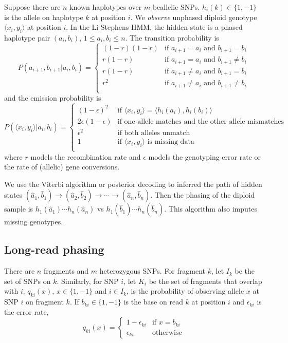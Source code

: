 \documentclass[10pt]{article}
\begin{document}
Suppose there are $n$ known haplotypes over $m$ beallelic SNPs.
$h_i(k)\in\{1,-1\}$ is the allele on haplotype $k$ at position $i$. We
\emph{observe} unphased diploid genotype $\langle x_i,y_i\rangle$ at position
$i$. In the Li-Stephens HMM, the hidden state is a phased haplotype pair
$(a_i,b_i)$, $1\le a_i,b_i\le n$. The transition probability is
$$
P(a_{i+1},b_{i+1}|a_i,b_i)=\left\{\begin{array}{ll}
(1-r)(1-r) & \mbox{if $a_{i+1}=a_i$ and $b_{i+1}=b_i$} \\
r(1-r) & \mbox{if $a_{i+1}=a_i$ and $b_{i+1}\not=b_i$} \\
r(1-r) & \mbox{if $a_{i+1}\not=a_i$ and $b_{i+1}=b_i$} \\
r^2 & \mbox{if $a_{i+1}\not=a_i$ and $b_{i+1}\not=b_i$} \\
\end{array}\right.
$$
and the emission probability is
$$
P(\langle x_i,y_i\rangle|a_i,b_i)=\left\{\begin{array}{ll}
(1-\epsilon)^2 & \mbox{if $\langle x_i,y_i\rangle=\langle h_i(a_i),h_i(b_i)\rangle$} \\
2\epsilon(1-\epsilon) & \mbox{if one allele matches and the other allele mismatches} \\
\epsilon^2 & \mbox{if both alleles unmatch}\\
1 & \mbox{if $\langle x_i,y_i\rangle$ is missing data} \\
\end{array}\right.
$$
where $r$ models the recombination rate and $\epsilon$ models the genotyping
error rate or the rate of (allelic) gene conversions.

We use the Viterbi algorithm or posterior decoding to inferred the path of
hidden states
$(\hat{a}_1,\hat{b}_1)\to(\hat{a}_2,\hat{b}_2)\to\cdots\to(\hat{a}_n,\hat{b}_n)$.
Then the phasing of the diploid sample is $h_1(\hat{a}_1)\cdots h_n(\hat{a}_n)$
vs $h_1(\hat{b}_1)\cdots h_n(\hat{b}_n)$. This algorithm also imputes missing
genotypes.

\subsection{Long-read phasing}

There are $n$ fragments and $m$ heterozygous SNPs. For fragment $k$, let $I_k$
be the set of SNPs on $k$. Similarly, for SNP $i$, let $K_i$ be the set of
fragments that overlap with $i$.  $q_{ki}(x)$, $x\in\{1,-1\}$ and $i\in I_k$,
is the probability of observing allele $x$ at SNP $i$ on fragment $k$. If
$b_{ki}\in\{1,-1\}$ is the base on read $k$ at position $i$ and $\epsilon_{ki}$
is the error rate,
$$
q_{ki}(x)=\left\{\begin{array}{ll}
1-\epsilon_{ki} & \mbox{if $x=b_{ki}$} \\
\epsilon_{ki} & \mbox{otherwise}
\end{array}\right.
$$
\end{document}
